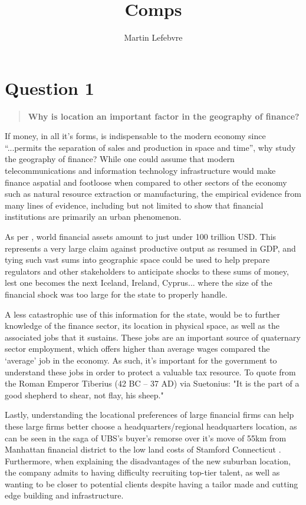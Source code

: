 \documentclass[12pt,letterpaper,notitlepage,onecolumn,final,openbib]{article}
\author{Martin Lefebvre}
\title{Comps}
\begin{document}
 
	
\section{Question 1}
\begin{quotation}
	\textbf{Why is location an important factor in the geography of finance?}
\end{quotation}

If money, in all it's forms, is indispensable to the modern economy since ``...permits the separation of sales and production in space and time''\cite[p.245]{harvey1999limits}, why study the geography of finance?  While one could assume that modern telecommunications and information technology infrastructure would make finance aspatial and footloose when compared to other sectors of the economy such as natural resource extraction or manufacturing, the empirical evidence from many lines of evidence, including but not limited to \cite{codethe1983,Code1991collapsing,GreenA1992,greena1993,Meyer2007,gongthe2012,GreenOLef2014} show that financial institutions are primarily an urban phenomenon.  

As per \cite{DixonMonk2014}, world financial assets amount to just under 100 trillion USD.  This represents a very large claim against productive output as resumed in GDP, and tying such vast sums into geographic space could be used to help prepare regulators and other stakeholders to anticipate shocks to these sums of money, lest one becomes the next Iceland, Ireland, Cyprus... where the size of the financial shock was too large for the state to properly handle.  

A less catastrophic use of this information for the state, would be to further knowledge of the finance sector, its location in physical space, as well as the associated jobs that it sustains.   These jobs are an important source of quaternary sector employment, which offers higher than average wages compared the `average' job in the economy.  As such, it's important for the government to understand these jobs in order to protect a valuable tax resource.  To quote from the Roman Emperor Tiberius (42 BC -- 37 AD) via Suetonius: "It is the part of a good shepherd to shear, not flay, his sheep."\cite{Suetonius} 

Lastly, understanding the locational preferences of large financial firms can help these large firms better choose a headquarters/regional headquarters location, as can be seen in the saga of UBS's buyer's remorse over it's move of 55km from Manhattan financial district to the low land costs of Stamford Connecticut \cite{NYT_2011}.  Furthermore, when explaining the disadvantages of the new suburban location, the company admits to having difficulty recruiting top-tier talent, as well as wanting to be closer to potential clients despite having a tailor made and cutting edge building and infrastructure.  
\end{document}
